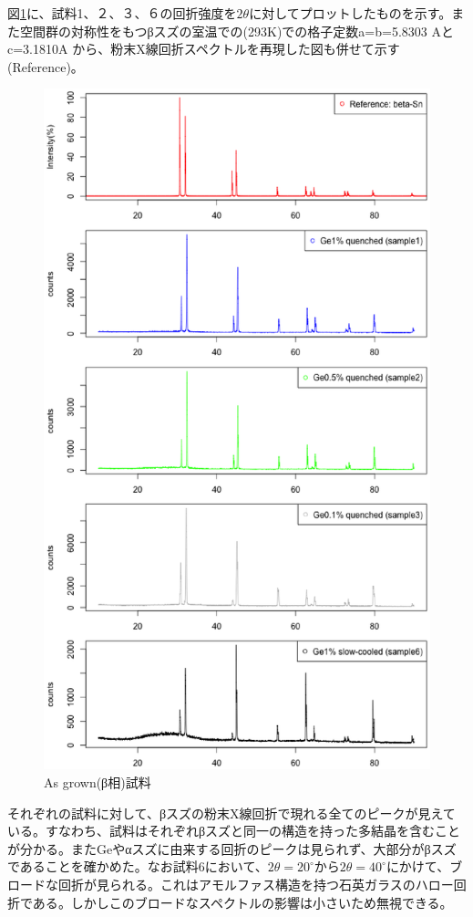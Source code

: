 図\ref{fig:intensity_asgrown_samples}に、試料1、２、３、６の回折強度を$2\theta$に対してプロットしたものを示す。また空間群の対称性をもつβスズの室温での(293K)での格子定数a=b=5.8303 Aとc=3.1810A \cite{Wolcyrz}から、粉末X線回折スペクトルを再現した図も併せて示す(Reference)。
\begin{figure}[!h]
    \begin{center}
   \includegraphics[width=0.8\hsize]{results_discussions/intensity_asgrown_samples.eps}
  \end{center}
  \caption{As grown(β相)試料}
  \label{fig:intensity_asgrown_samples}
\end{figure}

それぞれの試料に対して、βスズの粉末X線回折で現れる全てのピークが見えている。すなわち、試料はそれぞれβスズと同一の構造を持った多結晶を含むことが分かる。またGeやαスズに由来する回折のピークは見られず、大部分がβスズであることを確かめた。なお試料6において、$2\theta=20^\circ$から$2\theta=40^\circ$にかけて、ブロードな回折が見られる。これはアモルファス構造を持つ石英ガラスのハロー回折である\cite{Speakman}。しかしこのブロードなスペクトルの影響は小さいため無視できる。

